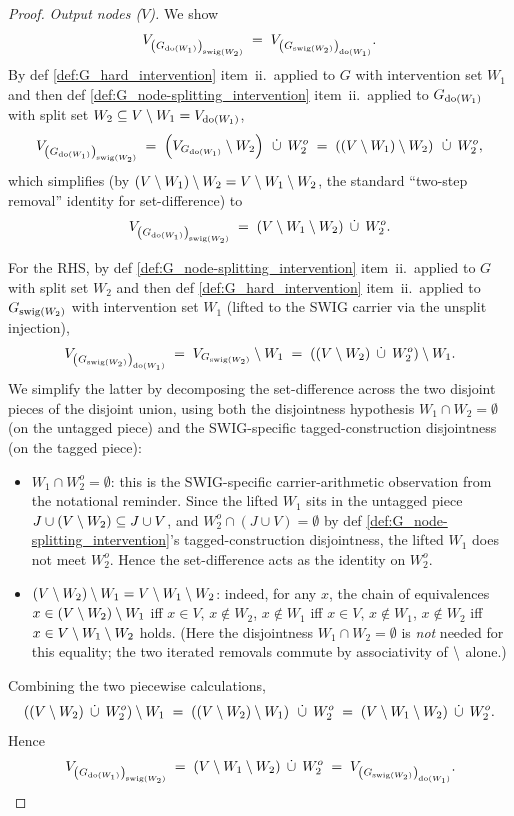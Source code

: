 \documentclass[main]{subfiles}
\begin{document}
\begin{proof}
\smallskip\noindent\emph{Output nodes ($V$).}
We show
\[ V_{\left ( G_{\operatorname{do}(W_1)} \right )_{\mathrm{swig}(W_2)}} \;=\; V_{\left ( G_{\mathrm{swig}(W_2)} \right )_{\operatorname{do}(W_1)}}. \]
By def \ref{def:G_hard_intervention} item~ii.\ applied to $G$ with intervention set $W_1$ and then def \ref{def:G_node-splitting_intervention} item~ii.\ applied to $G_{\operatorname{do}(W_1)}$ with split set $W_2 \subseteq V \setminus W_1 = V_{\operatorname{do}(W_1)}$,
\[
    V_{\left ( G_{\operatorname{do}(W_1)} \right )_{\mathrm{swig}(W_2)}}
    \;=\; \left ( V_{G_{\operatorname{do}(W_1)}} \setminus W_2 \right ) \;\,\dot{\cup}\,\; W_2^o
    \;=\; \left ( (V \setminus W_1) \setminus W_2 \right ) \;\,\dot{\cup}\,\; W_2^o,
\]
which simplifies (by $(V \setminus W_1) \setminus W_2 = V \setminus W_1 \setminus W_2$, the standard ``two-step removal'' identity for set-difference) to
\[
    V_{\left ( G_{\operatorname{do}(W_1)} \right )_{\mathrm{swig}(W_2)}}
    \;=\; (V \setminus W_1 \setminus W_2) \;\,\dot{\cup}\,\; W_2^o.
\]

For the RHS, by def \ref{def:G_node-splitting_intervention} item~ii.\ applied to $G$ with split set $W_2$ and then def \ref{def:G_hard_intervention} item~ii.\ applied to $G_{\mathrm{swig}(W_2)}$ with intervention set $W_1$ (lifted to the SWIG carrier via the unsplit injection),
\[
    V_{\left ( G_{\mathrm{swig}(W_2)} \right )_{\operatorname{do}(W_1)}}
    \;=\; V_{G_{\mathrm{swig}(W_2)}} \setminus W_1
    \;=\; \left ( (V \setminus W_2) \;\,\dot{\cup}\,\; W_2^o \right ) \setminus W_1.
\]
We simplify the latter by decomposing the set-difference across the two disjoint pieces of the disjoint union, using both the disjointness hypothesis $W_1 \cap W_2 = \emptyset$ (on the untagged piece) and the SWIG-specific tagged-construction disjointness (on the tagged piece):
\begin{itemize}
    \item $W_1 \cap W_2^o = \emptyset$: this is the SWIG-specific carrier-arithmetic observation from the notational reminder. Since the lifted $W_1$ sits in the untagged piece $J \cup (V \setminus W_2) \subseteq J \cup V$, and $W_2^o \cap (J \cup V) = \emptyset$ by def \ref{def:G_node-splitting_intervention}'s tagged-construction disjointness, the lifted $W_1$ does not meet $W_2^o$. Hence the set-difference acts as the identity on $W_2^o$.
    \item $(V \setminus W_2) \setminus W_1 = V \setminus W_1 \setminus W_2$: indeed, for any $x$, the chain of equivalences $x \in (V \setminus W_2) \setminus W_1$ iff $x \in V$, $x \notin W_2$, $x \notin W_1$ iff $x \in V$, $x \notin W_1$, $x \notin W_2$ iff $x \in V \setminus W_1 \setminus W_2$ holds. (Here the disjointness $W_1 \cap W_2 = \emptyset$ is \emph{not} needed for this equality; the two iterated removals commute by associativity of $\setminus$ alone.)
\end{itemize}
Combining the two piecewise calculations,
\[
    \left ( (V \setminus W_2) \;\,\dot{\cup}\,\; W_2^o \right ) \setminus W_1
    \;=\; \left ( (V \setminus W_2) \setminus W_1 \right ) \;\,\dot{\cup}\,\; W_2^o
    \;=\; (V \setminus W_1 \setminus W_2) \;\,\dot{\cup}\,\; W_2^o.
\]
Hence
\[
    V_{\left ( G_{\operatorname{do}(W_1)} \right )_{\mathrm{swig}(W_2)}}
    \;=\; (V \setminus W_1 \setminus W_2) \;\,\dot{\cup}\,\; W_2^o
    \;=\; V_{\left ( G_{\mathrm{swig}(W_2)} \right )_{\operatorname{do}(W_1)}}.
\]
\checkmark


\end{proof}
\end{document}
